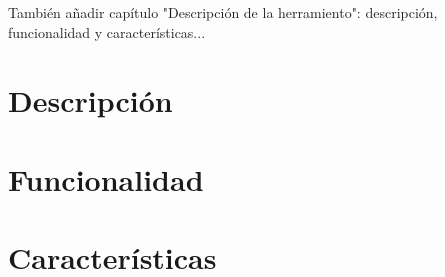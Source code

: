 
También añadir capítulo "Descripción de la herramiento": descripción, funcionalidad y características...

\section{Descripción}



\section{Funcionalidad}



\section{Características}